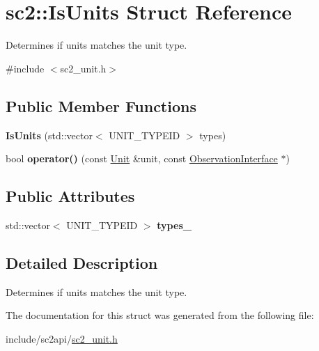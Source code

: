 \hypertarget{structsc2_1_1_is_units}{}\section{sc2\+:\+:Is\+Units Struct Reference}
\label{structsc2_1_1_is_units}


Determines if units matches the unit type.  




{\ttfamily \#include $<$sc2\+\_\+unit.\+h$>$}

\subsection*{Public Member Functions}
\begin{DoxyCompactItemize}
\item 
\mbox{\label{structsc2_1_1_is_units_a0571be5bc57424161ae96d4cdc079e69}} 
{\bfseries Is\+Units} (std\+::vector$<$ U\+N\+I\+T\+\_\+\+T\+Y\+P\+E\+ID $>$ types)
\item 
\mbox{\label{structsc2_1_1_is_units_ae978d1cabb755def0819aa8cb01754ca}} 
bool {\bfseries operator()} (const \hyperlink{classsc2_1_1_unit}{Unit} \&unit, const \hyperlink{classsc2_1_1_observation_interface}{Observation\+Interface} $\ast$)
\end{DoxyCompactItemize}
\subsection*{Public Attributes}
\begin{DoxyCompactItemize}
\item 
\mbox{\label{structsc2_1_1_is_units_ae70fdef96b1484d9b8bd47861231c1d7}} 
std\+::vector$<$ U\+N\+I\+T\+\_\+\+T\+Y\+P\+E\+ID $>$ {\bfseries types\+\_\+}
\end{DoxyCompactItemize}


\subsection{Detailed Description}
Determines if units matches the unit type. 

The documentation for this struct was generated from the following file\+:\begin{DoxyCompactItemize}
\item 
include/sc2api/\hyperlink{sc2__unit_8h}{sc2\+\_\+unit.\+h}\end{DoxyCompactItemize}
